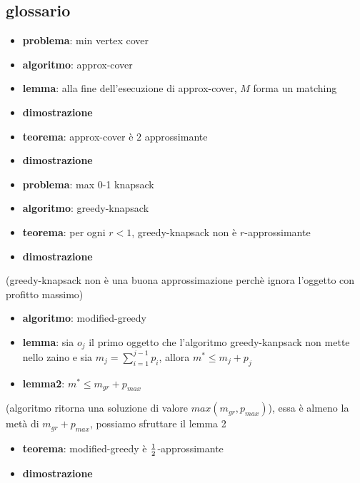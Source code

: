 \subsection*{glossario}

    \begin{itemize}

\item
  \textbf{problema}: min vertex cover
\item
  \textbf{algoritmo}: approx-cover
\item
  \textbf{lemma}: alla fine dell'esecuzione di approx-cover, \(M\) forma
  un matching
\item
  \textbf{dimostrazione}
\item
  \textbf{teorema}: approx-cover è \(2\) approssimante
\item
  \textbf{dimostrazione}
\end{itemize}

    \begin{itemize}

\item
  \textbf{problema}: max 0-1 knapsack
\item
  \textbf{algoritmo}: greedy-knapsack
\item
  \textbf{teorema}: per ogni \(r < 1\), greedy-knapsack non è
  \(r\)-approssimante
\item
  \textbf{dimostrazione}
\end{itemize}

(greedy-knapsack non è una buona approssimazione perchè ignora l'oggetto
con profitto massimo)

\begin{itemize}
\item
  \textbf{algoritmo}: modified-greedy
\item
  \textbf{lemma}: sia \(o_j\) il primo oggetto che l'algoritmo
  greedy-kanpsack non mette nello zaino e sia
  \(m_j = \sum_{i=1}^{j-1}p_i\), allora \(m^* \leq m_j + p_j\)
\item
  \textbf{lemma2}: \(m^* \leq m_{gr} + p_{max}\)
\end{itemize}

(algoritmo ritorna una soluzione di valore \(max(m_{gr}, p_{max})\)),
essa è almeno la metà di \(m_{gr} + p_{max}\), possiamo sfruttare il
lemma 2

\begin{itemize}

\item
  \textbf{teorema}: modified-greedy è \({1 \over 2}\)-approssimante
\item
  \textbf{dimostrazione}
\end{itemize}

